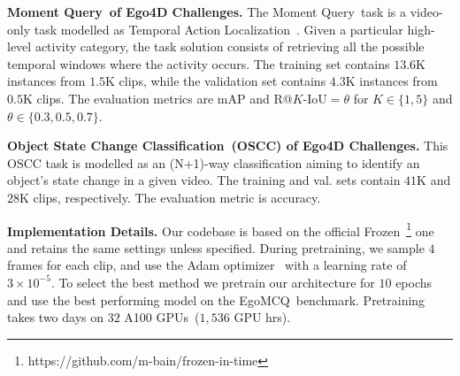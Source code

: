 \documentclass{article}
\newcommand{\eval}{EgoMCQ}
\newcommand{\mq}{Moment Query}
\newcommand{\ossc}{Object State Change Classification}
\begin{document}
\textbf{\mq~of Ego4D Challenges.}
The \mq~task is a video-only task modelled as Temporal Action Localization~\cite{caba2015activitynet}. Given a particular high-level activity category, the task solution consists of retrieving all the possible temporal windows where the activity occurs. 
The training set contains $13.6$K instances from $1.5$K clips, while the validation set contains $4.3$K instances from $0.5$K clips. 
The evaluation metrics are mAP and R@$K$-IoU${=}\theta$ for $K{\in}\{1,5\}$ and $\theta{\in}\{0.3,0.5,0.7\}$.

\textbf{\ossc~(OSCC) of Ego4D Challenges.}
This OSCC task is modelled as an (N+1)-way classification aiming to identify an object's state change in a given video.
The training and val. sets contain $41$K and $28$K clips, respectively.
The evaluation metric is accuracy. 

\textbf{Implementation Details.} Our codebase is based on the official Frozen~\footnote{https://github.com/m-bain/frozen-in-time} one and retains the same settings unless specified. During pretraining, 
we sample $4$ frames for each clip,
and use the Adam optimizer~\cite{kingma2014adam} with a learning rate of $3{\times}10^{-5}$. To select the best method we pretrain our architecture for $10$ epochs and use the best performing model on the \eval~benchmark. Pretraining takes two days on $32$ A100 GPUs~($1,536$ GPU hrs).
\end{document}
